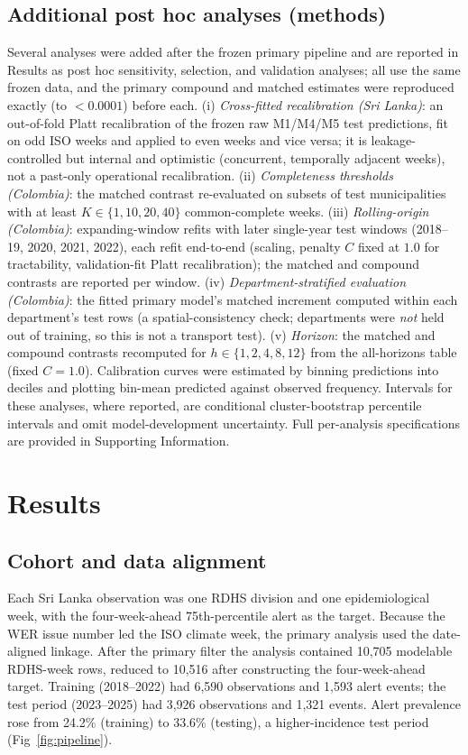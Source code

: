 \documentclass[11pt,a4paper]{article}
\begin{document}
\subsection{Additional post hoc analyses (methods)}
Several analyses were added after the frozen primary pipeline and are reported in Results as post hoc sensitivity, selection, and validation analyses; all use the same frozen data, and the primary compound and matched estimates were reproduced exactly (to $<0.0001$) before each. (i) \emph{Cross-fitted recalibration (Sri Lanka)}: an out-of-fold Platt recalibration of the frozen raw M1/M4/M5 test predictions, fit on odd ISO weeks and applied to even weeks and vice versa; it is leakage-controlled but internal and optimistic (concurrent, temporally adjacent weeks), not a past-only operational recalibration. (ii) \emph{Completeness thresholds (Colombia)}: the matched contrast re-evaluated on subsets of test municipalities with at least $K\in\{1,10,20,40\}$ common-complete weeks. (iii) \emph{Rolling-origin (Colombia)}: expanding-window refits with later single-year test windows (2018--19, 2020, 2021, 2022), each refit end-to-end (scaling, penalty $C$ fixed at $1.0$ for tractability, validation-fit Platt recalibration); the matched and compound contrasts are reported per window. (iv) \emph{Department-stratified evaluation (Colombia)}: the fitted primary model's matched increment computed within each department's test rows (a spatial-consistency check; departments were \emph{not} held out of training, so this is not a transport test). (v) \emph{Horizon}: the matched and compound contrasts recomputed for $h\in\{1,2,4,8,12\}$ from the all-horizons table (fixed $C=1.0$). Calibration curves were estimated by binning predictions into deciles and plotting bin-mean predicted against observed frequency. Intervals for these analyses, where reported, are conditional cluster-bootstrap percentile intervals and omit model-development uncertainty. Full per-analysis specifications are provided in Supporting Information.

\section{Results}

\subsection{Cohort and data alignment}
Each Sri Lanka observation was one RDHS division and one epidemiological week, with the four-week-ahead 75th-percentile alert as the target. Because the WER issue number led the ISO climate week, the primary analysis used the date-aligned linkage. After the primary filter the analysis contained 10{,}705 modelable RDHS-week rows, reduced to 10{,}516 after constructing the four-week-ahead target. Training (2018--2022) had 6{,}590 observations and 1{,}593 alert events; the test period (2023--2025) had 3{,}926 observations and 1{,}321 events. Alert prevalence rose from 24.2\% (training) to 33.6\% (testing), a higher-incidence test period (Fig~\ref{fig:pipeline}).
\end{document}
